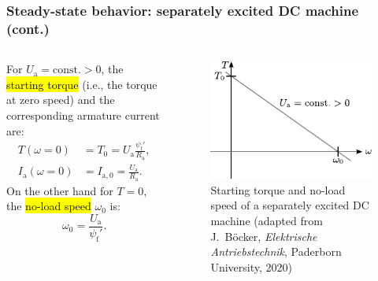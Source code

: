 \begin{frame}
	\frametitle{Steady-state behavior: separately excited DC machine (cont.)}
	\begin{columns}
		\begin{column}{0.50\textwidth}
		For $U_\mathrm{a}=\mbox{const.}>0$, the \hl{starting torque} (i.e., the torque at zero speed) and the corresponding armature current are:
		\begin{equation}
			\begin{split}
				T(\omega=0) &= T_0 = U_\mathrm{a}\frac{\psi_\mathrm{f}'}{R_\mathrm{a}}, \\ I_\mathrm{a}(\omega=0) &= I_{\mathrm{a},0}=  \frac{U_\mathrm{a}}{R_\mathrm{a}}.
			\end{split}
		\end{equation} \pause
		On the other hand for $T=0$, the \hl{no-load speed} $\omega_0$ is:
		\begin{equation}
			\omega_0 = \frac{U_\mathrm{a}}{\psi_\mathrm{f}'}.
		\end{equation} \pause
\end{column}
\hfill
\begin{column}{0.45\textwidth}
	\vspace{-0.2cm}
	\begin{figure}
		\centering
		\includegraphics{fig/lec03/Sep_DC_machine_starting_torque.pdf}
		\caption{Starting torque and no-load speed of a separately excited DC machine (adapted from J.~B\"ocker, \textit{Elektrische Antriebstechnik}, Paderborn University, 2020)}
	\end{figure}
\end{column}
\end{columns}		
\end{frame}

